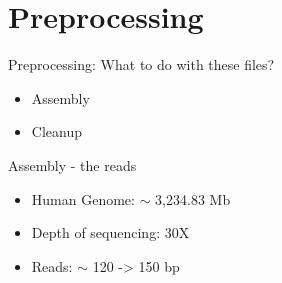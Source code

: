\documentclass[usepdftitle=false]{beamer}
\begin{document}
\section{Preprocessing}

\begin{frame}{Preprocessing: What to do with these files?}
	\begin{itemize}
		\item Assembly
		\pause
		\item Cleanup
	\end{itemize}
\end{frame}

\begin{frame}{Assembly - the reads}
	\begin{figure}
	\end{figure}
	\begin{itemize}
		\item Human Genome: $\sim$ 3,234.83 Mb
		\pause
		\item Depth of sequencing: 30X
		\pause
		\item Reads: $\sim$ 120 -> 150 bp
		\pause
		\pause
	\end{itemize}
\end{frame}
\end{document}
